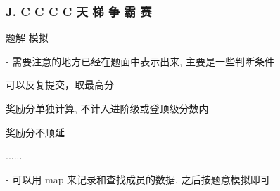 \renewcommand{\problemname}{J. C C C C 天 梯 争 霸 赛}


\begin{frame}\frametitle{\problemname}
	
	\begin{block}{题解}
		模拟

		- 需要注意的地方已经在题面中表示出来, 主要是一些判断条件

		  可以反复提交，取最高分  

		  奖励分单独计算, 不计入进阶级或登顶级分数内  

		  奖励分不顺延  

		  ......  

		- 可以用 map 来记录和查找成员的数据, 之后按题意模拟即可
		
	\end{block}
\end{frame}
